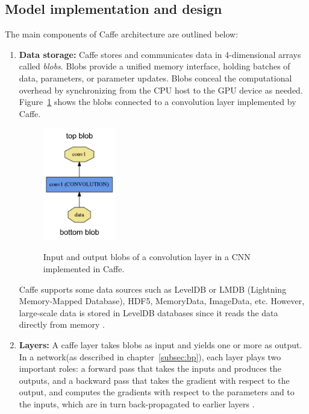 \subsection{Model implementation and design}
The main components of Caffe architecture are outlined below:
\begin{enumerate}

\item \textbf{Data storage:} Caffe stores and communicates data in 4-dimensional arrays called \textit{blobs}. Blobs provide a unified memory interface, holding batches of data, parameters, or parameter updates. Blobs conceal the computational overhead by synchronizing from the CPU host to the GPU device as needed. Figure~\ref{fig:blob} shows the blobs connected to a convolution layer implemented by Caffe.

\begin{figure}[H]
	\centering
	{\includegraphics[width=0.3\textwidth]{images/blob}}
	\caption{Input and output blobs of a convolution layer in a CNN implemented in Caffe.}
	\label{fig:blob}
\end{figure}


Caffe supports some data sources such as LevelDB or LMDB (Lightning Memory-Mapped Database), HDF5, MemoryData, ImageData, etc. However, large-scale data is stored in LevelDB databases since it reads the data directly from memory \cite{caffe}. 
\item \textbf{Layers:} A caffe layer takes blobs as input and yields one or more as output. In a network(as described in chapter~\ref{subsec:bp}), each layer plays two important roles: a forward pass that takes the inputs and produces the outputs, and a backward pass that takes the gradient with respect to the output, and computes the gradients with respect to the parameters and to the inputs, which are in turn back-propagated to earlier layers \cite{jia2014caffe}.


\end{enumerate}
